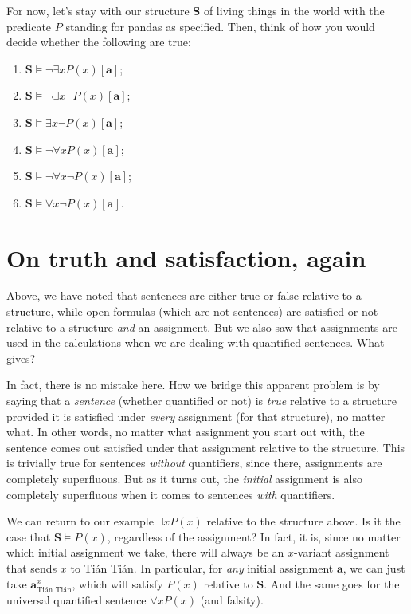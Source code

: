 \begin{exc}
For now, let's stay with our structure $\mathbf{S}$ of living things in the world with the predicate $P$ standing for pandas as specified. Then, think of how you would decide whether the following are true: 

\begin{enumerate}
	\item $\mathbf{S} \models \neg \exists x P(x)[\mathbf{a}]$;
	\item $\mathbf{S} \models \neg \exists x \neg P(x)[\mathbf{a}]$;
	\item $\mathbf{S} \models \exists x \neg P(x)[\mathbf{a}]$;
	\item $\mathbf{S} \models \neg \forall x P(x)[\mathbf{a}]$;
	\item $\mathbf{S} \models \neg \forall x \neg P(x)[\mathbf{a}]$;
	\item $\mathbf{S} \models \forall x \neg P(x)[\mathbf{a}]$.
\end{enumerate}
\end{exc}

\section{On truth and satisfaction, again}

Above, we have noted that sentences are either true or false relative to a structure, while open formulas (which are not sentences) are satisfied or not relative to a structure \textit{and} an assignment. But we also saw that assignments are used in the calculations when we are dealing with quantified sentences. What gives?

In fact, there is no mistake here. How we bridge this apparent problem is by saying that a \textit{sentence} (whether quantified or not) is \textit{true} relative to a structure provided it is satisfied under \textit{every} assignment (for that structure), no matter what. In other words, no matter what assignment you start out with, the sentence comes out satisfied under that assignment relative to the structure. This is trivially true for sentences \textit{without} quantifiers, since there, assignments are completely superfluous. But as it turns out, the \textit{initial} assignment is also completely superfluous when it comes to sentences \textit{with} quantifiers. 

We can return to our example $\exists x P(x)$ relative to the structure above. Is it the case that $\mathbf{S} \models P(x)$, regardless of the assignment? In fact, it is, since no matter which initial assignment we take, there will always be an $x$-variant assignment that sends $x$ to Tián Tián. In particular, for \textit{any} initial assignment $\mathbf{a}$, we can just take $\mathbf{a}^x_\text{Tián Tián}$, which will satisfy $P(x)$ relative to $\mathbf{S}$. And the same goes for the universal quantified sentence $\forall x P(x)$ (and falsity). 

